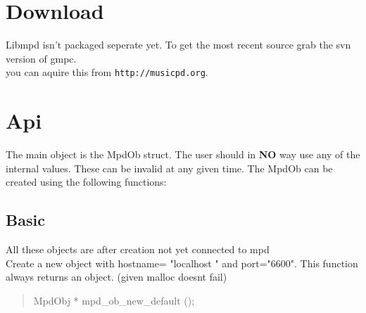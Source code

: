 \documentclass[a4paper,11pt]{article}
\newcommand{\tmstrong}[1]{\textbf{#1}}
\begin{document}
\section{Download}
Libmpd isn't packaged seperate yet. To get the most recent source grab the svn version of gmpc.\\
you can aquire this from \verb|http://musicpd.org|.\\


\section{Api}
The main object is the MpdOb struct. The user should in {\tmstrong{NO}} way
use any of the internal values. These can be invalid at any given time. The
MpdOb can be created using the following functions:

\subsection{Basic}

All these objects are after creation not yet connected to mpd\\

Create a new object with hostname= "localhost " and port="6600". This function always returns an object. (given malloc doesnt fail)
\begin{quote}
MpdObj * mpd\_ob\_new\_default (); 
\end{quote}
\end{document}
